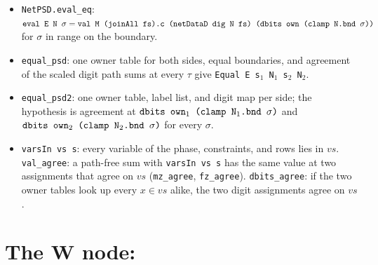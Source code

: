 \begin{theorem}
\begin{itemize}
\item \textnormal{\texttt{NetPSD.\allowbreak{}eval\_\allowbreak{}eq}}: $\textnormal{\texttt{eval E N \ensuremath{\sigma}}} = \textnormal{\texttt{val M (\allowbreak{}joinAll fs).\allowbreak{}c (\allowbreak{}netDataD dig N fs) (\allowbreak{}dbits own (\allowbreak{}clamp N.\allowbreak{}bnd \ensuremath{\sigma}))}}$
  for $\sigma$ in range on the boundary.
\item \textnormal{\texttt{equal\_\allowbreak{}psd}}: one owner table for both sides, equal boundaries, and agreement of the
  scaled digit path sums at every $\tau$ give \textnormal{\texttt{Equal E s\ensuremath{_1} N\ensuremath{_1} s\ensuremath{_2} N\ensuremath{_2}}}.
\item \textnormal{\texttt{equal\_\allowbreak{}psd2}}: one owner table, label list, and digit map per side; the hypothesis is
  agreement at $\textnormal{\texttt{dbits own\ensuremath{_1} (\allowbreak{}clamp N\ensuremath{_1}.\allowbreak{}bnd \ensuremath{\sigma})}}$ and $\textnormal{\texttt{dbits own\ensuremath{_2} (\allowbreak{}clamp N\ensuremath{_2}.\allowbreak{}bnd \ensuremath{\sigma})}}$ for
  every $\sigma$.
\item \textnormal{\texttt{varsIn vs s}}: every variable of the phase, constraints, and rows lies in $vs$.
  \textnormal{\texttt{val\_\allowbreak{}agree}}: a path-free sum with \textnormal{\texttt{varsIn vs s}} has the same value at two assignments
  that agree on $vs$ (\textnormal{\texttt{mz\_\allowbreak{}agree}}, \textnormal{\texttt{fz\_\allowbreak{}agree}}). \textnormal{\texttt{dbits\_\allowbreak{}agree}}: if the two owner
  tables look up every $x\in vs$ alike, the two digit assignments agree on $vs$.
\end{itemize}
\end{theorem}

\section{The W node: \texorpdfstring{}{PathSumW}}\label{sec:lean-pathsum-w}


